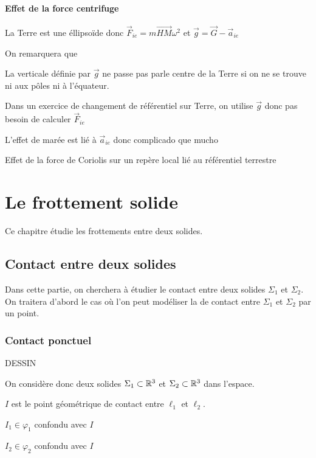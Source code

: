 \documentclass[a4paper,french,bookmarks]{book}
\newcommand{\chaptertoc}[0]{
    \setcounter{tocdepth}{2}
    \begin{tcolorbox}[
        enhanced,
        frame hidden,
        sharp corners,
        detach title,
        spread outwards     = 5pt,
        halign              = center,
        valign              = center,
        borderline west     = {3pt}{0pt}{main20!50!main2!95!gray!90},
        coltitle            = main20!50!main2!95!gray!90, 
        interior style      = {
            left color      = main1white2!65!gray!11,
            middle color    = main1white2!50!gray!10,
            right color     = main1white2!35!gray!9
        },
        arc                 = 0 cm,
        title               = SOMMAIRE,
        boxrule             = 0pt,
        fonttitle           = \bfseries\sffamily,
        overlay             = {
            \node[rotate=90, minimum width=1cm, anchor=south,yshift=-0.8cm]
            at (frame.west) {\tcbtitle};
        }
    ]
        \begin{minipage}{0.83\linewidth}
            \sffamily
            \minitoc
        \end{minipage}
    \end{tcolorbox}
}
\begin{document}
    \subsubsection{Effet de la force centrifuge}

    La Terre est une éllipsoïde donc \(\vec F_{ie} = m \vec{HM}\omega^2\) et \(\vec g = \vec G - \vec a_{ie}\)

    On remarquera que 
    \begin{enumerate}
        \itt La verticale définie par \(\vec g\) ne passe pas parle centre de la Terre si on ne se trouve ni aux pôles ni à l'équateur.

        \itt Dans un exercice de changement de référentiel sur Terre, on utilise \(\vec g\) donc pas besoin de calculer \(\vec F_{ie}\)

        \itt L'effet de marée est lié à \(\vec a_{ie}\) donc complicado que mucho

        \itt Effet de la force de Coriolis sur un repère local lié au référentiel terrestre
    \end{enumerate}

    \chapter{Le frottement solide}
    
    Ce chapitre étudie les frottements entre deux solides.
    
    \chaptertoc
    
    \section{Contact entre deux solides}
    
    Dans cette partie, on cherchera à étudier le contact entre deux solides
    $\Sigma_1$ et $\Sigma_2$. On traitera d'abord le cas où l'on peut
    modéliser la  de contact entre $\Sigma_1$ et $\Sigma_2$ par
    un point.
    
    \subsection{Contact ponctuel}
    
    \begin{minipage}{0.48\linewidth}
        DESSIN
    \end{minipage}
    \hfill
    \begin{minipage}{0.48\linewidth}
        On considère donc deux solides $\Sigma_1 \subset \mathbb{R}^3$ et $\Sigma_2 \subset \mathbb{R}^3$ dans l'espace. 
        \begin{enumerate}
            \itt $I$ est le point géométrique de contact entre $\ell_1$ et $\ell_2$. 
            
            \itt $I_1 \in \varphi_1$ confondu avec $I$
            
            \itt $I_2 \in \varphi_2$ confondu avec $I$
        \end{enumerate}
    \end{minipage}
    
\end{document}

